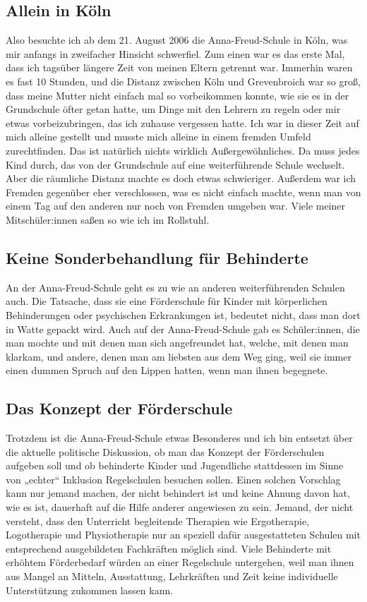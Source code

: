\documentclass[fontsize=14pt,a4paper,headinclude,DIV=calc,automark]{scrbook}
\begin{document}
\subsection{Allein in Köln}

Also besuchte ich ab dem 21. August 2006 die Anna-Freud-Schule in Köln, was mir anfangs in zweifacher Hinsicht schwerfiel. Zum einen war es das erste Mal, dass ich tagsüber längere Zeit von meinen Eltern getrennt war. Immerhin waren es fast 10 Stunden, und die Distanz zwischen Köln und Grevenbroich war so groß, dass meine Mutter nicht einfach mal so vorbeikommen konnte, wie sie es in der Grundschule öfter getan hatte, um Dinge mit den Lehrern zu regeln oder mir etwas vorbeizubringen, das ich zuhause vergessen hatte. Ich war in dieser Zeit auf mich alleine gestellt und musste mich alleine in einem fremden Umfeld zurechtfinden.
Das ist natürlich nichts wirklich Außergewöhnliches. Da muss jedes Kind durch, das von der Grundschule auf eine weiterführende Schule wechselt. Aber die räumliche Distanz machte es doch etwas schwieriger. Außerdem war ich Fremden gegenüber eher verschlossen, was es nicht einfach machte, wenn man von einem Tag auf den anderen nur noch von Fremden umgeben war. Viele meiner Mitschüler:innen saßen so wie ich im Rollstuhl.

\subsection{Keine Sonderbehandlung für Behinderte}

An der Anna-Freud-Schule geht es zu wie an anderen weiterführenden Schulen auch. Die Tatsache, dass sie eine Förderschule für Kinder mit körperlichen Behinderungen oder psychischen Erkrankungen ist, bedeutet nicht, dass man dort in Watte gepackt wird. Auch auf der Anna-Freud-Schule gab es Schüler:innen, die man mochte und mit denen man sich angefreundet hat, welche, mit denen man klarkam, und andere, denen man am liebsten aus dem Weg ging, weil sie immer einen dummen Spruch auf den Lippen hatten, wenn man ihnen begegnete.

\subsection{Das Konzept der Förderschule}

Trotzdem ist die Anna-Freud-Schule etwas Besonderes und ich bin entsetzt über die aktuelle politische Diskussion, ob man das Konzept der Förderschulen aufgeben soll und ob behinderte Kinder und Jugendliche stattdessen im Sinne von „echter“ Inklusion Regelschulen besuchen sollen. Einen solchen Vorschlag kann nur jemand machen, der nicht behindert ist und keine Ahnung davon hat, wie es ist, dauerhaft auf die Hilfe anderer angewiesen zu sein. Jemand, der nicht versteht, dass den Unterricht begleitende Therapien wie Ergotherapie, Logotherapie und Physiotherapie nur an speziell dafür ausgestatteten Schulen mit entsprechend ausgebildeten Fachkräften möglich sind. Viele Behinderte mit erhöhtem Förderbedarf würden an einer Regelschule untergehen, weil man ihnen aus Mangel an Mitteln, Ausstattung, Lehrkräften und Zeit keine individuelle Unterstützung zukommen lassen kann.
\end{document}
